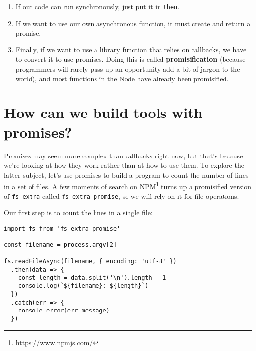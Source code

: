 \documentclass[krantzl]{krantz}
\newcommand{\glossref}[1]{\textbf{#1}}
\newcommand{\hreffoot}[2]{{#1}\footnote{\href{#2}{#2}}}
\begin{document}
\begin{enumerate}

\item 

If our code can run synchronously, just put it in \texttt{then}.



\item 

If we want to use our own asynchronous function,
    it must create and return a promise.



\item 

Finally,
    if we want to use a library function that relies on callbacks,
    we have to convert it to use promises.
    Doing this is called \glossref{promisification}
    (because programmers will rarely pass up an opportunity add a bit of jargon to the world),
    and most functions in the Node have already been promisified.



\end{enumerate}

\section{How can we build tools with promises?}\label{async-programming-tools}


Promises may seem more complex than callbacks right now,
but that's because we're looking at how they work rather than at how to use them.
To explore the latter subject,
let's use promises to build a program to count the number of lines in a set of files.
A few moments of search on \hreffoot{NPM}{https://www.npmjs.com/} turns up a promisified version of \texttt{fs-extra}
called \texttt{fs-extra-promise},
so we will rely on it for file operations.


Our first step is to count the lines in a single file:


\begin{lstlisting}[frame=single,frameround=tttt]
import fs from 'fs-extra-promise'

const filename = process.argv[2]

fs.readFileAsync(filename, { encoding: 'utf-8' })
  .then(data => {
    const length = data.split('\n').length - 1
    console.log(`${filename}: ${length}`)
  })
  .catch(err => {
    console.error(err.message)
  })
\end{lstlisting}
\end{document}
